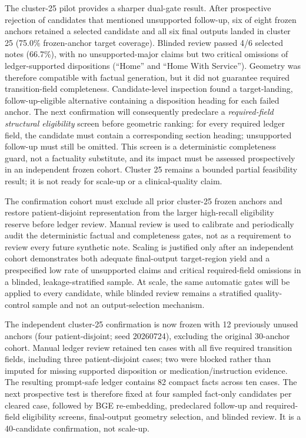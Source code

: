 \documentclass[11pt]{article}
\begin{document}
The cluster-25 pilot provides a sharper dual-gate result. After prospective rejection of candidates that mentioned unsupported follow-up, six of eight frozen anchors retained a selected candidate and all six final outputs landed in cluster 25 (75.0\% frozen-anchor target coverage). Blinded review passed 4/6 selected notes (66.7\%), with no unsupported-major claims but two critical omissions of ledger-supported dispositions (``Home'' and ``Home With Service''). Geometry was therefore compatible with factual generation, but it did not guarantee required transition-field completeness. Candidate-level inspection found a target-landing, follow-up-eligible alternative containing a disposition heading for each failed anchor. The next confirmation will consequently predeclare a \emph{required-field structural eligibility} screen before geometric ranking: for every required ledger field, the candidate must contain a corresponding section heading; unsupported follow-up must still be omitted. This screen is a deterministic completeness guard, not a factuality substitute, and its impact must be assessed prospectively in an independent frozen cohort. Cluster 25 remains a bounded partial feasibility result; it is not ready for scale-up or a clinical-quality claim.

The confirmation cohort must exclude all prior cluster-25 frozen anchors and restore patient-disjoint representation from the larger high-recall eligibility reserve before ledger review. Manual review is used to calibrate and periodically audit the deterministic factual and completeness gates, not as a requirement to review every future synthetic note. Scaling is justified only after an independent cohort demonstrates both adequate final-output target-region yield and a prespecified low rate of unsupported claims and critical required-field omissions in a blinded, leakage-stratified sample. At scale, the same automatic gates will be applied to every candidate, while blinded review remains a stratified quality-control sample and not an output-selection mechanism.

The independent cluster-25 confirmation is now frozen with 12 previously unused anchors (four patient-disjoint; seed 20260724), excluding the original 30-anchor cohort. Manual ledger review retained ten cases with all five required transition fields, including three patient-disjoint cases; two were blocked rather than imputed for missing supported disposition or medication/instruction evidence. The resulting prompt-safe ledger contains 82 compact facts across ten cases. The next prospective test is therefore fixed at four sampled fact-only candidates per cleared case, followed by BGE re-embedding, predeclared follow-up and required-field eligibility screens, final-output geometry selection, and blinded review. It is a 40-candidate confirmation, not scale-up.
\end{document}
